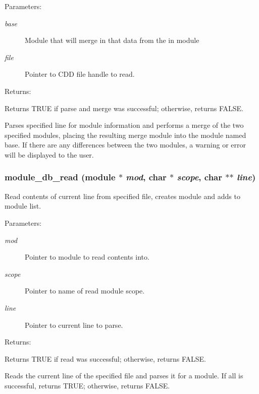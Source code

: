 \begin{Desc}
\item[Parameters: ]\par
\begin{description}
\item[{\em 
base}]Module that will merge in that data from the in module \item[{\em 
file}]Pointer to CDD file handle to read.\end{description}
\end{Desc}
\begin{Desc}
\item[Returns: ]\par
Returns TRUE if parse and merge was successful; otherwise, returns FALSE.\end{Desc}
Parses specified line for module information and performs a merge of the two  specified modules, placing the resulting merge module into the module named base. If there are any differences between the two modules, a warning or error will be displayed to the user. 
\subsubsection{ module\_\-db\_\-read ({\bf module} $\ast$ {\em mod}, char $\ast$ {\em scope}, char $\ast$$\ast$ {\em line})}\label{module_8h_a3}


Read contents of current line from specified file, creates module and adds to module list.

\begin{Desc}
\item[Parameters: ]\par
\begin{description}
\item[{\em 
mod}]Pointer to module to read contents into. \item[{\em 
scope}]Pointer to name of read module scope. \item[{\em 
line}]Pointer to current line to parse.\end{description}
\end{Desc}
\begin{Desc}
\item[Returns: ]\par
Returns TRUE if read was successful; otherwise, returns FALSE.\end{Desc}
Reads the current line of the specified file and parses it for a module. If all is successful, returns TRUE; otherwise, returns FALSE. 
